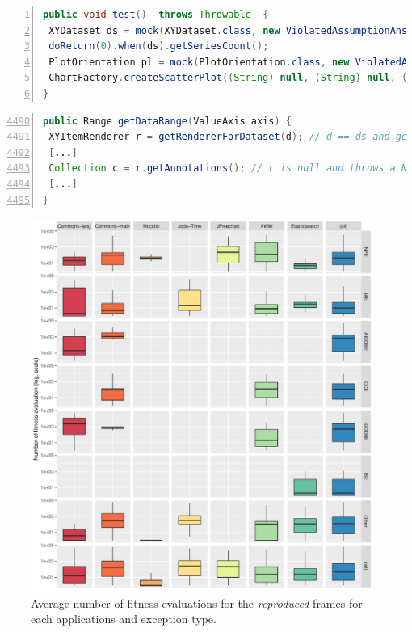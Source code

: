 \begin{lstlisting}[frame=tb,
  caption=The test case generated by EvoCrash for reproducing the 6th frame of CHART-4b,
  label=list:NPEtest,
  captionpos=t,
  language=Java,
  numbers=left]
public void test()  throws Throwable  {
 XYDataset ds = mock(XYDataset.class, new ViolatedAssumptionAnswer()); *\label{line:NPEtest:mock1}*
 doReturn(0).when(ds).getSeriesCount();
 PlotOrientation pl = mock(PlotOrientation.class, new ViolatedAssumptionAnswer()); *\label{line:NPEtest:mock2}*
 ChartFactory.createScatterPlot((String) null, (String) null, (String) null, ds, pl, true, true, true); *\label{line:NPEtest:crashcall}*
}
\end{lstlisting}

\begin{lstlisting}[frame=tb,
  caption={Code excerpt from JFreeChart \texttt{XYPlot.java}},
  label=list:XYPlot,
  captionpos=t,
  language=Java,
  numbers=left,
  firstnumber=4490,
  stepnumber=1]
public Range getDataRange(ValueAxis axis) {
 XYItemRenderer r = getRendererForDataset(d); // d == ds and getRendererForDataset(d) returns null *\label{line:XYPlot:null}*
 [...]
 Collection c = r.getAnnotations(); // r is null and throws a NPE *\label{line:XYPlot:NPE}*
 [...]
}
\end{lstlisting}

\begin{figure}[t]
	\centering
	\includegraphics[width=\textwidth]{papers/jcrashpack/rq2_excepappstats.pdf}
	\caption{Average number of fitness evaluations for the \textit{reproduced} frames for each applications and exception type.}
	\label{figure:appexcepstats}
\end{figure}

